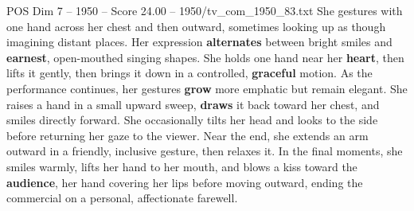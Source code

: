 \begin{textsample}{POS Dim 7 – 1950 – Score 24.00 – 1950/tv\_com\_1950\_83.txt}
She gestures with one hand across her chest and then outward, sometimes looking up as though imagining distant places.
Her expression \textbf{alternates} between bright smiles and \textbf{earnest}, open-mouthed singing shapes.
She holds one hand near her \textbf{heart}, then lifts it gently, then brings it down in a controlled, \textbf{graceful} motion.
As the performance continues, her gestures \textbf{grow} more emphatic but remain elegant.
She raises a hand in a small upward sweep, \textbf{draws} it back toward her chest, and smiles directly forward.
She occasionally tilts her head and looks to the side before returning her gaze to the viewer.
Near the end, she extends an arm outward in a friendly, inclusive gesture, then relaxes it.
In the final moments, she smiles warmly, lifts her hand to her mouth, and blows a kiss toward the \textbf{audience}, her hand covering her lips before moving outward, ending the commercial on a personal, affectionate farewell.

\end{textsample}

